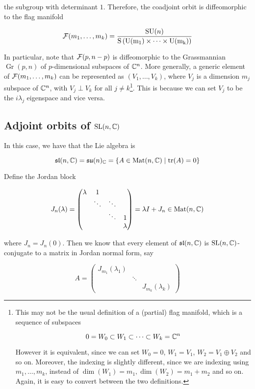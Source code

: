 \documentclass{article}
\DeclareMathOperator{\SU}{SU}
\newcommand{\su}{\mathfrak{su}}
\renewcommand{\sl}{\mathfrak{sl}}
\DeclareMathOperator{\Gr}{Gr}
\begin{document}
the subgroup with determinant \(1\). Therefore, the coadjoint orbit is diffeomorphic to the flag manifold

\[\mcF(m_1, \dots, m_k) = \frac{\SU(n)}{\rm S\left(\rm U(m_1) \times \cdots \times \rm U(m_k)\right)}\]

In particular, note that \(\mathcal{F}(p, n-p)\) is diffeomorphic to the Grassmannian \(\Gr(p, n)\) of \(p\)-dimensional subspaces of \(\mathbb{C}^n\). More generally, a generic element of \(\mathcal{F}(m_1, \dots, m_k)\) can be represented as \((V_1, \dots, V_k)\), where \(V_j\) is a dimension \(m_j\) subspace of \(\mathbb{C}^n\), with \(V_j \perp V_k\) for all \(j \ne k\)\footnote{This may not be the usual definition of a (partial) flag manifold, which is a sequence of subspaces 

\[0 = W_0 \subset W_1 \subset \cdots \subset W_k = \mathbb{C}^n\]

However it is equivalent, since we can set \(W_0 = 0\), \(W_1 = V_1\), \(W_2 = V_1 \oplus V_2\) and so on. Moreover, the indexing is slightly different, since we are indexing using \(m_1, \dots, m_k\), instead of \(\dim(W_1) = m_1, \dim(W_2) = m_1 + m_2\) and so on. Again, it is easy to convert between the two definitions.}. This is because we can set \(V_j\) to be the \(i\lambda_j\) eigenspace and vice versa.

\subsection{Adjoint orbits of \(\operatorname{SL}(n, \mathbb{C})\)}

In this case, we have that the Lie algebra is

\[\sl(n, \C) = \su(n)_\C = \left\{A \in \Mat(n, \C) \mid \tr(A) = 0\right\}\]

Define the Jordan block

\[J_n(\lambda) = \begin{pmatrix}
    \lambda & 1 \\
    & \ddots & \ddots \\
    & & \ddots & 1 \\
    & & & \lambda
\end{pmatrix} = \lambda I + J_n \in \operatorname{Mat}(n, \mathbb{C})\]

where \(J_n = J_n(0)\). Then we know that every element of \(\sl(n, \C)\) is \(\operatorname{SL}(n, \mathbb{C})\)-conjugate to a matrix in Jordan normal form, say

\[A = \begin{pmatrix}
    J_{m_1}(\lambda_1) \\
    & \ddots \\
    & & J_{m_k}(\lambda_k)
\end{pmatrix}\]
\end{document}
